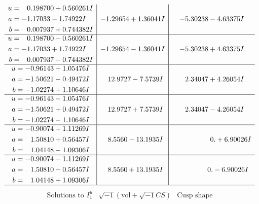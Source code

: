 \documentclass[1p]{elsarticle_modified}
\theoremstyle{definition}
\newcommand{\I}{\sqrt{-1}}
\begin{document}
$$\begin{array}{c|c|c}
\begin{aligned}
u &= \phantom{-}0.198700 + 0.560261 I \\
a &= -1.17033 - 1.74922 I \\
b &= \phantom{-}0.007937 + 0.744382 I\end{aligned}
 & -1.29654 + 1.36041 I & -5.30238 - 4.63375 I \\ \hline\begin{aligned}
u &= \phantom{-}0.198700 - 0.560261 I \\
a &= -1.17033 + 1.74922 I \\
b &= \phantom{-}0.007937 - 0.744382 I\end{aligned}
 & -1.29654 - 1.36041 I & -5.30238 + 4.63375 I \\ \hline\begin{aligned}
u &= -0.96143 + 1.05476 I \\
a &= -1.50621 - 0.49472 I \\
b &= -1.02274 + 1.10646 I\end{aligned}
 & \phantom{-}12.9727 - 7.5739 I & \phantom{-}2.34047 + 4.26054 I \\ \hline\begin{aligned}
u &= -0.96143 - 1.05476 I \\
a &= -1.50621 + 0.49472 I \\
b &= -1.02274 - 1.10646 I\end{aligned}
 & \phantom{-}12.9727 + 7.5739 I & \phantom{-}2.34047 - 4.26054 I \\ \hline\begin{aligned}
u &= -0.90074 + 1.11269 I \\
a &= \phantom{-}1.50810 + 0.56457 I \\
b &= \phantom{-}1.04148 - 1.09306 I\end{aligned}
 & \phantom{-}8.5560 - 13.1935 I & \phantom{-0.000000 -}0. + 6.90026 I \\ \hline\begin{aligned}
u &= -0.90074 - 1.11269 I \\
a &= \phantom{-}1.50810 - 0.56457 I \\
b &= \phantom{-}1.04148 + 1.09306 I\end{aligned}
 & \phantom{-}8.5560 + 13.1935 I & \phantom{-0.000000 } 0. - 6.90026 I\\
 \hline 
 \end{array}$$\newpage$$\begin{array}{c|c|c}  
\text{Solutions to }I^u_{1}& \I (\text{vol} + \sqrt{-1}CS) & \text{Cusp shape}\\
 \hline 
\begin{aligned}

\end{aligned}
\end{array}$$
\end{document}
